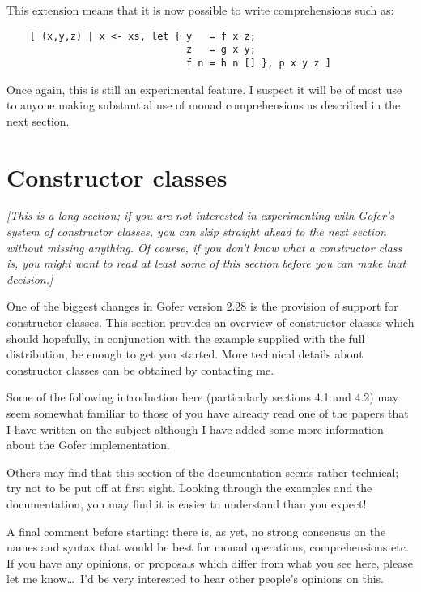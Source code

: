 This extension means that it is now possible to write comprehensions
such as:
\begin{verbatim}
    [ (x,y,z) | x <- xs, let { y   = f x z;
                               z   = g x y;
                               f n = h n [] }, p x y z ]
\end{verbatim}     
Once again, this is still an experimental feature.  I suspect it will
be of most use to anyone making substantial use of monad comprehensions
as described in the next section.


\section{Constructor classes}

{\sl [This is a long section; if you are not interested in experimenting
with Gofer's system of constructor classes, you can skip straight ahead
to the next section without missing anything.  Of course, if you don't
know what a constructor class is, you might want to read at least some
of this section before you can make that decision.]}

One of the biggest changes in Gofer version 2.28 is the provision of
support for constructor classes.  This section provides an overview of
constructor classes which should hopefully, in conjunction with the
example supplied with the full distribution, be enough to get you
started.  More technical details about constructor classes can be
obtained by contacting me.

Some of the following introduction here (particularly sections 4.1 and
4.2) may seem somewhat familiar to those of you have already read one
of the papers that I have written on the subject although I have added
some more information about the Gofer implementation.

Others may find that this section of the documentation seems rather
technical; try not to be put off at first sight.  Looking through the
examples and the documentation, you may find it is easier to understand
than you expect!

A final comment before starting: there is, as yet, no strong consensus
on the names and syntax that would be best for monad operations,
comprehensions etc.  If you have any opinions, or proposals which
differ from what you see here, please let me know\dots\ I'd be very
interested to hear other people's opinions on this.


